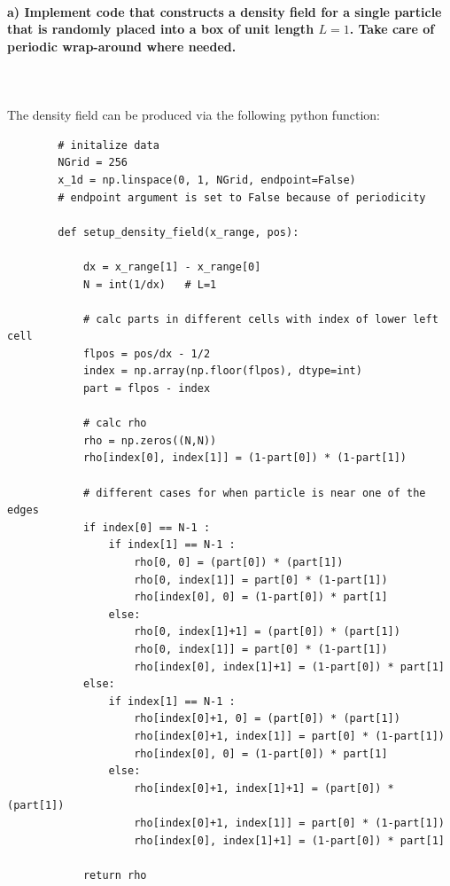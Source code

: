 \paragraph{a) Implement code that constructs a density field for a single 
    particle that is randomly placed into a box of unit length $L=1$. 
    Take care of periodic wrap-around where needed.
} \ \\
    \\
    The density field can be produced via the following python function:
    \begin{lstlisting}
        # initalize data
        NGrid = 256
        x_1d = np.linspace(0, 1, NGrid, endpoint=False) 
        # endpoint argument is set to False because of periodicity

        def setup_density_field(x_range, pos):

            dx = x_range[1] - x_range[0]
            N = int(1/dx)   # L=1

            # calc parts in different cells with index of lower left cell
            flpos = pos/dx - 1/2
            index = np.array(np.floor(flpos), dtype=int)
            part = flpos - index

            # calc rho
            rho = np.zeros((N,N))
            rho[index[0], index[1]] = (1-part[0]) * (1-part[1])

            # different cases for when particle is near one of the edges
            if index[0] == N-1 :
                if index[1] == N-1 :
                    rho[0, 0] = (part[0]) * (part[1])
                    rho[0, index[1]] = part[0] * (1-part[1])
                    rho[index[0], 0] = (1-part[0]) * part[1]
                else:
                    rho[0, index[1]+1] = (part[0]) * (part[1])
                    rho[0, index[1]] = part[0] * (1-part[1])
                    rho[index[0], index[1]+1] = (1-part[0]) * part[1]
            else:
                if index[1] == N-1 :
                    rho[index[0]+1, 0] = (part[0]) * (part[1])
                    rho[index[0]+1, index[1]] = part[0] * (1-part[1])
                    rho[index[0], 0] = (1-part[0]) * part[1]
                else:
                    rho[index[0]+1, index[1]+1] = (part[0]) * (part[1])
                    rho[index[0]+1, index[1]] = part[0] * (1-part[1])
                    rho[index[0], index[1]+1] = (1-part[0]) * part[1]

            return rho\end{lstlisting}

\newpage
